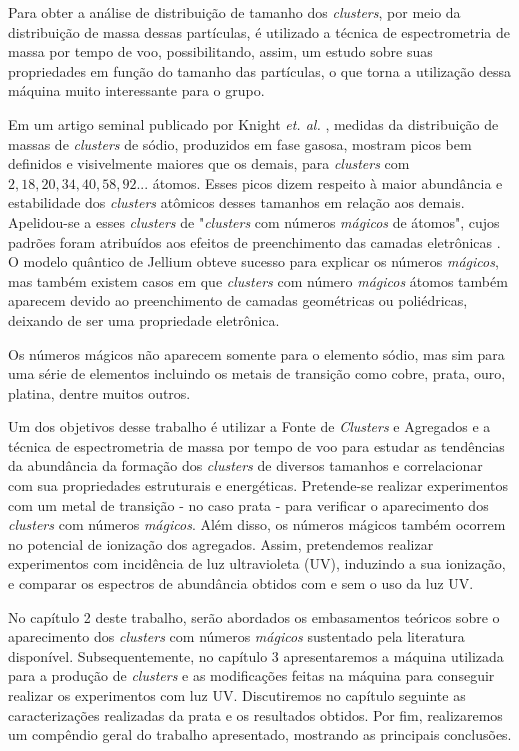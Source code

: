 Para obter a análise de distribuição de tamanho dos \textit{clusters}, por meio da distribuição de massa dessas partículas, é utilizado a técnica de espectrometria de massa por tempo de voo, possibilitando, assim, um estudo sobre suas propriedades em função do tamanho das partículas, o que torna a utilização dessa máquina muito interessante para o grupo.


Em um artigo seminal publicado por Knight \textit{et. al.} \cite{electronic_Shell_sodium}, medidas da distribuição de massas de \textit{clusters} de sódio, produzidos em fase gasosa, mostram picos bem definidos e visivelmente maiores que os demais, para \textit{clusters} com $2, 18, 20, 34, 40, 58,92 ...$ átomos. Esses picos dizem respeito à maior abundância e estabilidade dos \textit{clusters} atômicos desses tamanhos em relação aos demais. Apelidou-se a esses \textit{clusters} de "\textit{clusters} com números
\textit{mágicos} de átomos", cujos padrões foram atribuídos aos efeitos de preenchimento das camadas eletrônicas \cite{Brack}. O modelo quântico de Jellium \cite{jellium} obteve sucesso para explicar os números \textit{mágicos}, mas também existem casos em que \textit{clusters} com número \textit{mágicos} átomos também aparecem devido ao preenchimento de camadas geométricas ou poliédricas, deixando de ser uma propriedade eletrônica.


Os números mágicos não aparecem somente para o elemento sódio, mas sim para uma série de elementos incluindo os metais de transição como \cite{magic_1B}  cobre, prata, ouro, platina, dentre muitos outros.

Um dos objetivos desse trabalho é utilizar a Fonte de \textit{Clusters} e Agregados e a técnica de espectrometria de massa por tempo de voo para estudar as tendências da abundância da formação dos \textit{clusters} de diversos tamanhos e correlacionar com sua propriedades estruturais e energéticas. Pretende-se realizar experimentos com um metal de transição - no caso prata - para verificar o aparecimento dos \textit{clusters} com números \textit{mágicos}. Além disso, os números mágicos também ocorrem no potencial de ionização dos agregados. Assim, pretendemos realizar experimentos com incidência de luz ultravioleta (UV), induzindo a sua ionização, e comparar os espectros de abundância obtidos com e sem o uso da luz UV. 

No capítulo 2 deste trabalho, serão  abordados os embasamentos teóricos sobre o aparecimento dos \textit{clusters} com números \textit{mágicos} sustentado pela literatura disponível. Subsequentemente, no capítulo 3 apresentaremos a máquina utilizada para a produção de \textit{clusters} e as modificações feitas na máquina para conseguir realizar os experimentos com luz UV. Discutiremos no capítulo seguinte as caracterizações
realizadas da prata e os resultados obtidos. Por fim, realizaremos um
compêndio geral do trabalho apresentado, mostrando as principais conclusões. 



 